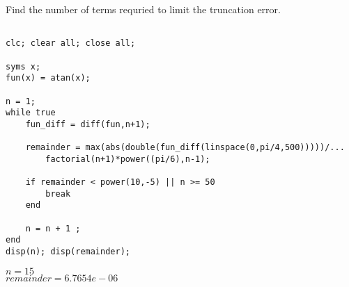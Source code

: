 \documentclass[12pt]{article}
\newenvironment{problem}[2][Problem]{\begin{trivlist}
\item[\hskip \labelsep {\bfseries #1}\hskip \labelsep {\bfseries #2.}]}{\end{trivlist}}
\begin{document}
\begin{problem}{iii} Find the number of terms requried to limit the truncation error.
\begin{lstlisting}

clc; clear all; close all;

syms x;
fun(x) = atan(x);

n = 1;
while true
    fun_diff = diff(fun,n+1);
    
    remainder = max(abs(double(fun_diff(linspace(0,pi/4,500)))))/...
        factorial(n+1)*power((pi/6),n-1);
    
    if remainder < power(10,-5) || n >= 50
        break
    end
    
    n = n + 1 ;
end   
disp(n); disp(remainder);

\end{lstlisting}
$n=15$\\
$remainder = 6.7654e-06$
\end{problem}
\end{document}
